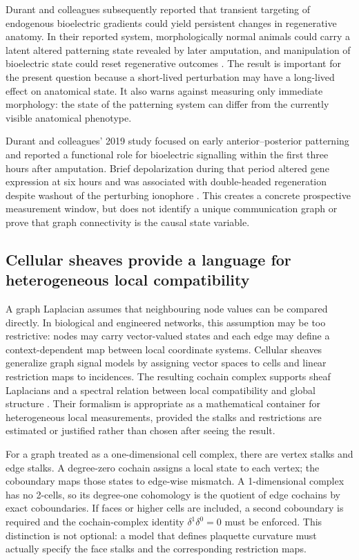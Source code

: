 \documentclass[12pt,a4paper]{article}
\begin{document}
Durant and colleagues subsequently reported that transient targeting of endogenous bioelectric gradients could yield persistent changes in regenerative anatomy. In their reported system, morphologically normal animals could carry a latent altered patterning state revealed by later amputation, and manipulation of bioelectric state could reset regenerative outcomes \citep{Durant2017}. The result is important for the present question because a short-lived perturbation may have a long-lived effect on anatomical state. It also warns against measuring only immediate morphology: the state of the patterning system can differ from the currently visible anatomical phenotype.

Durant and colleagues' 2019 study focused on early anterior--posterior patterning and reported a functional role for bioelectric signalling within the first three hours after amputation. Brief depolarization during that period altered gene expression at six hours and was associated with double-headed regeneration despite washout of the perturbing ionophore \citep{Durant2019}. This creates a concrete prospective measurement window, but does not identify a unique communication graph or prove that graph connectivity is the causal state variable.

\subsection{Cellular sheaves provide a language for heterogeneous local compatibility}
A graph Laplacian assumes that neighbouring node values can be compared directly. In biological and engineered networks, this assumption may be too restrictive: nodes may carry vector-valued states and each edge may define a context-dependent map between local coordinate systems. Cellular sheaves generalize graph signal models by assigning vector spaces to cells and linear restriction maps to incidences. The resulting cochain complex supports sheaf Laplacians and a spectral relation between local compatibility and global structure \citep{HansenGhrist2019}. Their formalism is appropriate as a mathematical container for heterogeneous local measurements, provided the stalks and restrictions are estimated or justified rather than chosen after seeing the result.

For a graph treated as a one-dimensional cell complex, there are vertex stalks and edge stalks. A degree-zero cochain assigns a local state to each vertex; the coboundary maps those states to edge-wise mismatch. A 1-dimensional complex has no 2-cells, so its degree-one cohomology is the quotient of edge cochains by exact coboundaries. If faces or higher cells are included, a second coboundary is required and the cochain-complex identity \(\delta^1\delta^0=0\) must be enforced. This distinction is not optional: a model that defines plaquette curvature must actually specify the face stalks and the corresponding restriction maps.
\end{document}
